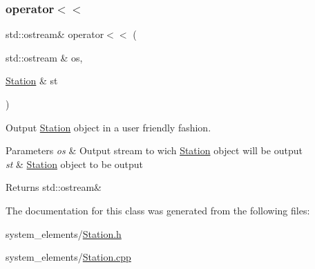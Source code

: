 \subsubsection{\texorpdfstring{operator$<$$<$}{operator<<}}
{\footnotesize\ttfamily std\+::ostream\& operator$<$$<$ (\begin{DoxyParamCaption}\item[{std\+::ostream \&}]{os,  }\item[{\mbox{\hyperlink{classStation}{Station}} \&}]{st }\end{DoxyParamCaption})\hspace{0.3cm}{\ttfamily [friend]}}



Output \mbox{\hyperlink{classStation}{Station}} object in a user friendly fashion. 


\begin{DoxyParams}{Parameters}
{\em os} & Output stream to wich \mbox{\hyperlink{classStation}{Station}} object will be output \\
\hline
{\em st} & \mbox{\hyperlink{classStation}{Station}} object to be output \\
\hline
\end{DoxyParams}
\begin{DoxyReturn}{Returns}
std\+::ostream\& 
\end{DoxyReturn}


The documentation for this class was generated from the following files\+:\begin{DoxyCompactItemize}
\item 
system\+\_\+elements/\mbox{\hyperlink{Station_8h}{Station.\+h}}\item 
system\+\_\+elements/\mbox{\hyperlink{Station_8cpp}{Station.\+cpp}}\end{DoxyCompactItemize}

